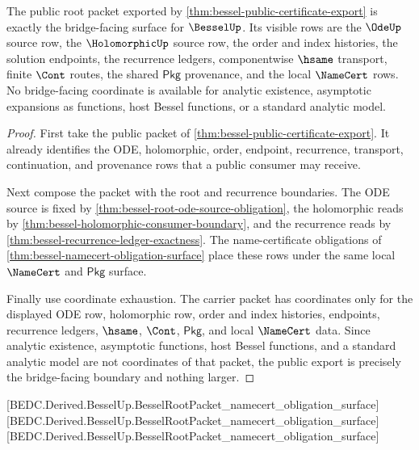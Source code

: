 \begin{theorem}
\label{thm:bessel-standard-root-bridge-boundary}
The public root packet exported by
\autoref{thm:bessel-public-certificate-export} is exactly the bridge-facing
surface for $\BesselUp$. Its visible rows are the $\OdeUp$ source row, the
$\HolomorphicUp$ source row, the order and index histories, the solution
endpoints, the recurrence ledgers, componentwise $\hsame$ transport, finite
$\Cont$ routes, the shared $\mathsf{Pkg}$ provenance, and the local
$\NameCert$ rows. No bridge-facing coordinate is available for analytic
existence, asymptotic expansions as functions, host Bessel functions, or a
standard analytic model.
\end{theorem}
\begin{proof}
First take the public packet of
\autoref{thm:bessel-public-certificate-export}. It already identifies the
ODE, holomorphic, order, endpoint, recurrence, transport, continuation, and
provenance rows that a public consumer may receive.

Next compose the packet with the root and recurrence boundaries. The ODE
source is fixed by \autoref{thm:bessel-root-ode-source-obligation}, the
holomorphic reads by \autoref{thm:bessel-holomorphic-consumer-boundary}, and
the recurrence reads by \autoref{thm:bessel-recurrence-ledger-exactness}. The
name-certificate obligations of
\autoref{thm:bessel-namecert-obligation-surface} place these rows under the
same local $\NameCert$ and $\mathsf{Pkg}$ surface.

Finally use coordinate exhaustion. The carrier packet has coordinates only for
the displayed ODE row, holomorphic row, order and index histories, endpoints,
recurrence ledgers, $\hsame$, $\Cont$, $\mathsf{Pkg}$, and local
$\NameCert$ data. Since analytic existence, asymptotic functions, host Bessel
functions, and a standard analytic model are not coordinates of that packet,
the public export is precisely the bridge-facing boundary and nothing larger.
\end{proof}

[BEDC.Derived.BesselUp.BesselRootPacket\_namecert\_obligation\_surface]
[BEDC.Derived.BesselUp.BesselRootPacket\_namecert\_obligation\_surface]
[BEDC.Derived.BesselUp.BesselRootPacket\_namecert\_obligation\_surface]

